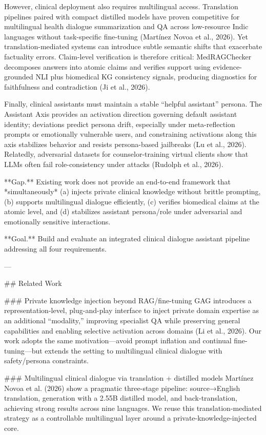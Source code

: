 However, clinical deployment also requires multilingual access. Translation pipelines paired with compact distilled models have proven competitive for multilingual health dialogue summarization and QA across low-resource Indic languages without task-specific fine-tuning (Martínez Novoa et al., 2026). Yet translation-mediated systems can introduce subtle semantic shifts that exacerbate factuality errors. Claim-level verification is therefore critical: MedRAGChecker decomposes answers into atomic claims and verifies support using evidence-grounded NLI plus biomedical KG consistency signals, producing diagnostics for faithfulness and contradiction (Ji et al., 2026).  

Finally, clinical assistants must maintain a stable “helpful assistant” persona. The Assistant Axis provides an activation direction governing default assistant identity; deviations predict persona drift, especially under meta-reflection prompts or emotionally vulnerable users, and constraining activations along this axis stabilizes behavior and resists persona-based jailbreaks (Lu et al., 2026). Relatedly, adversarial datasets for counselor-training virtual clients show that LLMs often fail role-consistency under attacks (Rudolph et al., 2026).  

**Gap.** Existing work does not provide an end-to-end framework that *simultaneously* (a) injects private clinical knowledge without brittle prompting, (b) supports multilingual dialogue efficiently, (c) verifies biomedical claims at the atomic level, and (d) stabilizes assistant persona/role under adversarial and emotionally sensitive interactions.  

**Goal.** Build and evaluate an integrated clinical dialogue assistant pipeline addressing all four requirements.

---

## Related Work  

### Private knowledge injection beyond RAG/fine-tuning  
GAG introduces a representation-level, plug-and-play interface to inject private domain expertise as an additional “modality,” improving specialist QA while preserving general capabilities and enabling selective activation across domains (Li et al., 2026). Our work adopts the same motivation—avoid prompt inflation and continual fine-tuning—but extends the setting to multilingual clinical dialogue with safety/persona constraints.

### Multilingual clinical dialogue via translation + distilled models  
Martínez Novoa et al. (2026) show a pragmatic three-stage pipeline: source→English translation, generation with a 2.55B distilled model, and back-translation, achieving strong results across nine languages. We reuse this translation-mediated strategy as a controllable multilingual layer around a private-knowledge-injected core.

